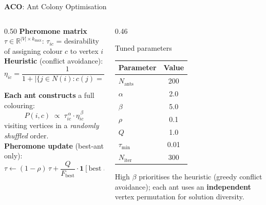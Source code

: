 \documentclass[aspectratio=169,10pt]{beamer}
\newcommand{\col}{c}
\newcommand{\fitF}{F}
\newcommand{\algbox}[2]{\textcolor{#1}{\textbf{#2}}}
\begin{document}
\begin{frame}{\algbox{algacocolor}{ACO}: Ant Colony Optimisation}

\begin{columns}[T]
\begin{column}{0.50\textwidth}
\textbf{Pheromone matrix} $\tau \in \mathbb{R}^{|V| \times k_{\max}}$:
$\tau_{ic}$ = desirability of assigning colour $c$ to vertex $i$\\[0.5em]

\textbf{Heuristic} (conflict avoidance):
\[
  \eta_{ic} = \frac{1}{1 + |\{j \in N(i) : \col(j)=c\}|}
\]

\textbf{Each ant constructs} a full colouring:
\[
  P(i,c) \;\propto\; \tau_{ic}^{\,\alpha} \cdot \eta_{ic}^{\,\beta}
\]
visiting vertices in a \emph{randomly shuffled} order.\\[0.5em]

\textbf{Pheromone update} (best-ant only):
\[
  \tau \leftarrow (1-\rho)\,\tau + \frac{Q}{\fitF_{\text{best}}} \cdot \mathbf{1}[\text{best ant}]
\]
\end{column}

\begin{column}{0.46\textwidth}
\begin{block}{Tuned parameters}
\renewcommand{\arraystretch}{1.1}
\begin{tabular}{lc}
\toprule
Parameter & Value \\
\midrule
$N_{\text{ants}}$ & 200 \\
$\alpha$          & 2.0 \\
$\beta$           & 5.0 \\
$\rho$            & 0.1 \\
$Q$               & 1.0 \\
$\tau_{\min}$     & 0.01 \\
$N_{\text{iter}}$ & 300 \\
\bottomrule
\end{tabular}
\end{block}

\vspace{0.5em}
High $\beta$ prioritises the heuristic (greedy conflict avoidance); each ant uses an \textbf{independent} vertex permutation for solution diversity.
\end{column}
\end{columns}

\end{frame}
\end{document}
